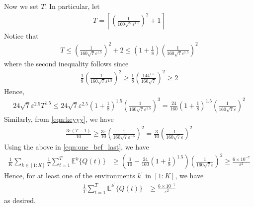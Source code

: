\documentclass[12pt,draftcls, onecolumn]{IEEEtran}
\begin{document}
{Now we set $T$. In particular, let
\begin{align}\label{eqn:keyyy}
    T = \left\lceil \left(\frac{1}{160\sqrt{7}\varepsilon^{1.5}} \right)^2 + 1\right\rceil
\end{align}
Notice that
\begin{align}
    T \leq  \left(\frac{1}{160\sqrt{7}\varepsilon^{1.5}} \right)^2 + 2\leq  \left(1+\frac{1}{8}\right)\left(\frac{1}{160\sqrt{7}\varepsilon^{1.5}} \right)^2 \nonumber
\end{align}
where the second inequality follows since
\begin{align}
  \frac{1}{8}\left(\frac{1}{160\sqrt{7}\varepsilon^{1.5}} \right)^2 \geq \frac{1}{8}\left(\frac{144^{1.5}}{160\sqrt{7}} \right)^2 \geq 2 \nonumber
\end{align}
Hence,
\begin{align}
     24\sqrt{7}\varepsilon^{2.5}T^{1.5}  \leq 24\sqrt{7}\varepsilon^{2.5}\left( 1+\frac{1}{8}\right)^{1.5}\left(\frac{1}{160\sqrt{7}\varepsilon^{1.5}} \right)^3 = \frac{24}{160}\left( 1+\frac{1}{8}\right)^{1.5}\left(\frac{1}{160\sqrt{7} \varepsilon}\right)^2 \nonumber
\end{align}
Similarly, from \eqref{eqn:keyyy}, we have
\begin{align}
   \frac{3\varepsilon (T-1)}{10} \geq \frac{3\varepsilon}{10}\left(\frac{1}{160\sqrt{7} \varepsilon^{1.5}}\right)^2 = \frac{3}{10}\left(\frac{1}{160\sqrt{7} \varepsilon}\right)^2 \nonumber
\end{align}
Using the above in \eqref{eqn:one_bef_last}, we have
\begin{align}
\frac{1}{K} \sum_{k \in [1:K]} \frac{1}{T} \sum_{t = 1}^T  \mathbb{E}^k\{Q(t) \} & \geq\left( \frac{3}{10} -  \frac{24}{160}\left(1+ \frac{1}{8}\right)^{1.5}\right)\left(\frac{1}{160\sqrt{7} \varepsilon}\right)^2 \geq \frac{6 \times 10^{-7}}{\varepsilon^2} \nonumber
\end{align}
Hence, for at least one of the environments $k^{'}$ in $[1:K]$, we have
\begin{align}
 \frac{1}{T} \sum_{t = 1}^T  \mathbb{E}^{k^{'}}\{Q(t) \} &  \geq \frac{6 \times 10^{-7}}{\varepsilon^2} \nonumber
\end{align}
as desired.



}
\end{document}
